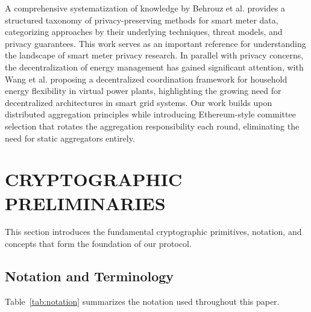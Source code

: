 \documentclass[conference]{IEEEtran}
\begin{document}
A comprehensive systematization of knowledge by Behrouz et al. \cite{behrouz2024privacy} provides a structured taxonomy of privacy-preserving methods for smart meter data, categorizing approaches by their underlying techniques, threat models, and privacy guarantees. This work serves as an important reference for understanding the landscape of smart meter privacy research. In parallel with privacy concerns, the decentralization of energy management has gained significant attention, with Wang et al. \cite{wang2024decentralized} proposing a decentralized coordination framework for household energy flexibility in virtual power plants, highlighting the growing need for decentralized architectures in smart grid systems. Our work builds upon distributed aggregation principles while introducing Ethereum-style committee selection that rotates the aggregation responsibility each round, eliminating the need for static aggregators entirely.

\section{CRYPTOGRAPHIC PRELIMINARIES}

This section introduces the fundamental cryptographic primitives, notation, and concepts that form the foundation of our protocol.

\subsection{Notation and Terminology}

Table~\ref{tab:notation} summarizes the notation used throughout this paper.
\end{document}
